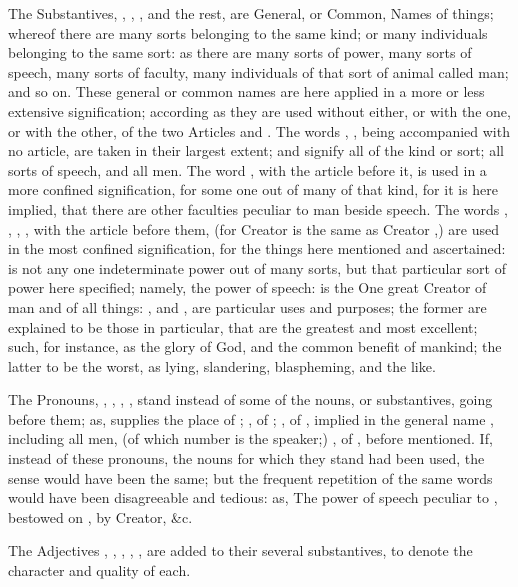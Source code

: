 The Substantives, , , , and the rest,
are General, or Common, Names of things; whereof there are many sorts
belonging to the same kind; or many individuals belonging to the same
sort: as there are many sorts of power, many sorts of speech, many sorts
of faculty, many individuals of that sort of animal called man; and so
on. These general or common names are here applied in a more or less
extensive signification; according as they are used without either, or
with the one, or with the other, of the two Articles  and
. The words , , being accompanied with no
article, are taken in their largest extent; and signify all of the kind
or sort; all sorts of speech, and all men. The word , with
the article  before it, is used in a more confined signification,
for some one out of many of that kind, for it is here implied, that
there are other faculties peculiar to man beside speech. The words
, , , , with the article
 before them, (for  Creator is the same as 
Creator ,) are used in the most confined signification, for
the things here mentioned and ascertained:  is not any one
indeterminate power out of many sorts, but that particular sort of power
here specified; namely, the power of speech:  is the One
great Creator of man and of all things: , and , are particular uses and purposes; the former are explained
to be those in particular, that are the greatest and most excellent;
such, for instance, as the glory of God, and the common benefit of
mankind; the latter to be the worst, as lying, slandering, blaspheming,
and the like.

The Pronouns, , , , , stand instead of
some of the nouns, or substantives, going before them; as, 
supplies the place of ; , of ; , of
, implied in the general name , including all men, (of
which number is the speaker;) , of , before
mentioned. If, instead of these pronouns, the nouns for which they stand
had been used, the sense would have been the same; but the frequent
repetition of the same words would have been disagreeable and tedious:
as, The power of speech peculiar to , bestowed on , by
 Creator, \&c.

The Adjectives , , ,
, , are added to their several substantives, to
denote the character and quality of each.

